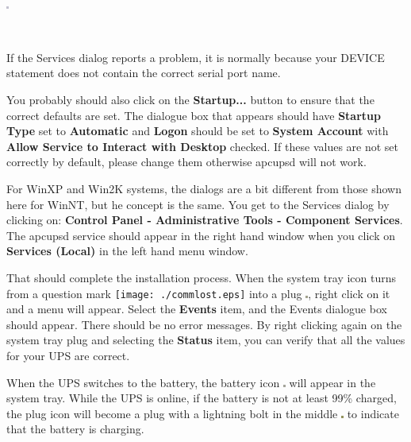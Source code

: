 {{{{{{{\footnotesize
\begin{verbatim}
     
\end{verbatim}
\normalsize

\includegraphics{./wininstall6.eps}  

\footnotesize
\begin{verbatim}
     
\end{verbatim}
\normalsize

If the Services dialog reports a problem, it is normally because your DEVICE
statement does not contain the correct serial port name. 

You probably should also click on the {\bf Startup...} button to ensure that
the correct defaults are set. The dialogue box that appears should have {\bf
Startup Type} set to {\bf Automatic} and {\bf Logon} should be set to {\bf
System Account} with {\bf Allow Service to Interact with Desktop} checked. If
these values are not set correctly by default, please change them otherwise
apcupsd will not work.  

For WinXP and Win2K systems, the dialogs are a bit different from
those shown here for WinNT, but he concept is the same. You get to the
Services dialog by clicking on: {\bf Control Panel -\gt{} Administrative Tools
-\gt{} Component Services}. The apcupsd service should appear in the right
hand window when you click on {\bf Services (Local)} in the left hand menu
window.  

That should complete the installation process. When the system tray icon turns
from a question mark \texttt{[image: ./commlost.eps]} into a plug
\includegraphics{./online.eps}, right click on it and a menu will appear.
Select the {\bf Events} item, and the Events dialogue box should appear. There
should be no error messages. By right clicking again on the system tray plug
and selecting the {\bf Status} item, you can verify that all the values for
your UPS are correct.  

When the UPS switches to the battery, the battery icon 
\includegraphics{./onbatt.eps} will appear in the system tray. While the 
UPS is online, if the battery is not at least 99\% charged, the plug icon 
will become a plug with a lightning bolt in the middle 
\includegraphics{./charging.eps} to indicate that the battery is charging. 


}}}}}}}
